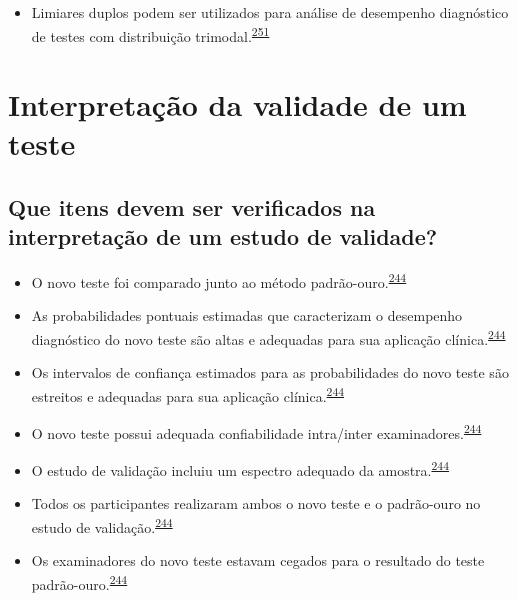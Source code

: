 \documentclass[
  a4paper,
]{book}
\providecommand{\tightlist}{%
  \setlength{\itemsep}{0pt}\setlength{\parskip}{0pt}}
\begin{document}
\begin{itemize}
\tightlist
\item
  Limiares duplos podem ser utilizados para análise de desempenho diagnóstico de testes com distribuição trimodal.\textsuperscript{\protect\hyperlink{ref-ferreira2021}{251}}
\end{itemize}

\hypertarget{interpretacao-desempenho}{%
\section{Interpretação da validade de um teste}\label{interpretacao-desempenho}}

\hypertarget{que-itens-devem-ser-verificados-na-interpretauxe7uxe3o-de-um-estudo-de-validade}{%
\subsection{Que itens devem ser verificados na interpretação de um estudo de validade?}\label{que-itens-devem-ser-verificados-na-interpretauxe7uxe3o-de-um-estudo-de-validade}}

\begin{itemize}
\item
  O novo teste foi comparado junto ao método padrão-ouro.\textsuperscript{\protect\hyperlink{ref-greenhalgh1997b}{244}}
\item
  As probabilidades pontuais estimadas que caracterizam o desempenho diagnóstico do novo teste são altas e adequadas para sua aplicação clínica.\textsuperscript{\protect\hyperlink{ref-greenhalgh1997b}{244}}
\item
  Os intervalos de confiança estimados para as probabilidades do novo teste são estreitos e adequadas para sua aplicação clínica.\textsuperscript{\protect\hyperlink{ref-greenhalgh1997b}{244}}
\item
  O novo teste possui adequada confiabilidade intra/inter examinadores.\textsuperscript{\protect\hyperlink{ref-greenhalgh1997b}{244}}
\item
  O estudo de validação incluiu um espectro adequado da amostra.\textsuperscript{\protect\hyperlink{ref-greenhalgh1997b}{244}}
\item
  Todos os participantes realizaram ambos o novo teste e o padrão-ouro no estudo de validação.\textsuperscript{\protect\hyperlink{ref-greenhalgh1997b}{244}}
\item
  Os examinadores do novo teste estavam cegados para o resultado do teste padrão-ouro.\textsuperscript{\protect\hyperlink{ref-greenhalgh1997b}{244}}
\end{itemize}
\end{document}
